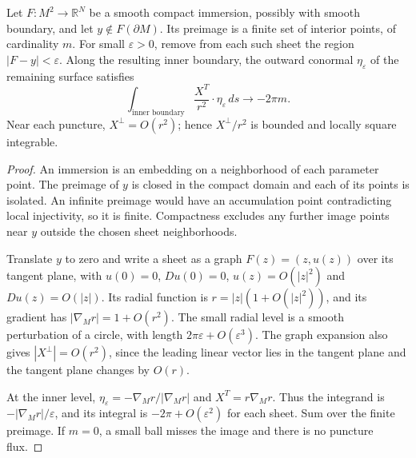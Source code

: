 \begin{lemma}\label{lem:willmore-puncture-flux}
Let $F:M^2\to\mathbb R^N$ be a smooth compact immersion, possibly with smooth boundary, and let $y\notin F(\partial M)$. Its preimage is a finite set of interior points, of cardinality $m$. For small $\varepsilon>0$, remove from each such sheet the region $|F-y|<\varepsilon$. Along the resulting inner boundary, the outward conormal $\eta_\varepsilon$ of the remaining surface satisfies
\[
 \int_{\text{inner boundary}}\frac{X^T}{r^2}\cdot\eta_\varepsilon\,ds\longrightarrow-2\pi m.
\]
Near each puncture, $X^\perp=O(r^2)$; hence $X^\perp/r^2$ is bounded and locally square integrable.
\end{lemma}
\begin{proof}
An immersion is an embedding on a neighborhood of each parameter point. The preimage of $y$ is closed in the compact domain and each of its points is isolated. An infinite preimage would have an accumulation point contradicting local injectivity, so it is finite. Compactness excludes any further image points near $y$ outside the chosen sheet neighborhoods.

Translate $y$ to zero and write a sheet as a graph $F(z)=(z,u(z))$ over its tangent plane, with $u(0)=0$, $Du(0)=0$, $u(z)=O(|z|^2)$ and $Du(z)=O(|z|)$. Its radial function is $r=|z|(1+O(|z|^2))$, and its gradient has $|\nabla_Mr|=1+O(r^2)$. The small radial level is a smooth perturbation of a circle, with length $2\pi\varepsilon+O(\varepsilon^3)$. The graph expansion also gives $|X^\perp|=O(r^2)$, since the leading linear vector lies in the tangent plane and the tangent plane changes by $O(r)$.

At the inner level, $\eta_\varepsilon=-\nabla_Mr/|\nabla_Mr|$ and $X^T=r\nabla_Mr$. Thus the integrand is $-|\nabla_Mr|/\varepsilon$, and its integral is $-2\pi+O(\varepsilon^2)$ for each sheet. Sum over the finite preimage. If $m=0$, a small ball misses the image and there is no puncture flux.
\end{proof}

